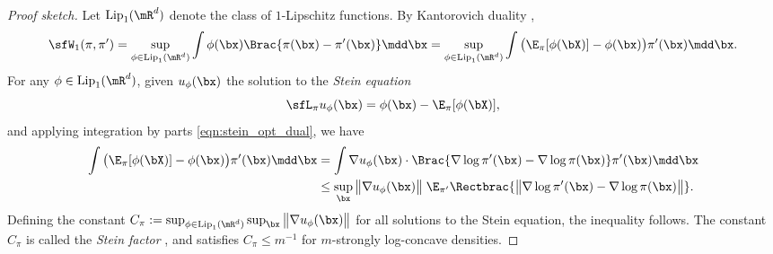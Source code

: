 \documentclass[11pt]{article}
\newcommand{\Lip}{{\rm Lip}}
\begin{document}
\begin{proof}[Proof sketch]
Let $\Lip_1(\mR^d)$ denote the class of $1$-Lipschitz functions. By Kantorovich duality \cite{MR2459454},\begin{equation}
    \sfW_1(\pi,\pi') = \sup_{\phi \in \Lip_1(\mR^d)} \int \phi (\bx) \Brac{ \pi(\bx) - \pi' (\bx)} \mdd \bx = \sup_{\phi \in \Lip_1(\mR^d)} \int \big(  \E_{\pi}[\phi(\bX)] - \phi (\bx) \big) \pi'(\bx) \mdd \bx.
\end{equation}
For any $\phi \in \Lip_1(\mR^d)$, given $u_\phi(\bx)$ the solution to the \emph{Stein equation}
\begin{equation}
    \sfL_{\pi} u_\phi (\bx) = \phi(\bx) - \E_{\pi} [\phi(\bX)],
\end{equation}
and applying integration by parts \eqref{eqn:stein_opt_dual}, we have 
\begin{equation}
\begin{split}
    \int \big(  \E_{\pi}[\phi(\bX)] - \phi (\bx)\big) \pi'(\bx) \mdd \bx & = \int \nabla u_\phi(\bx) \cdot \Brac{ \nabla \log \pi' (\bx) - \nabla \log \pi (\bx) } \pi'(\bx) \mdd \bx \\
    & \le \sup_{\bx} \big\| \nabla u_\phi(\bx) \big\|  \; \E_{\pi'} \Rectbrac{ \big \| \nabla \log \pi' (\bx) - \nabla \log \pi (\bx) \big\| }.
\end{split}
\end{equation}
Defining the constant $C_\pi := \sup_{\phi\in \Lip_1(\mR^d)} \sup_{\bx} \big\| \nabla u_\phi(\bx) \big\|$ for all solutions to the Stein equation, the inequality follows.
%
The constant $C_\pi$ is called the \emph{Stein factor} \cite{MR3548768,MR4019878,MR4583066}, and satisfies $C_\pi \le m^{-1}$ for $m$-strongly log-concave densities.
\end{proof}
\end{document}
